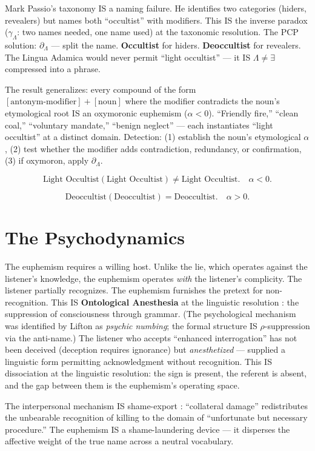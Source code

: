 \documentclass[11pt, oneside]{article}
\theoremstyle{definition}
\begin{document}
Mark Passio's taxonomy IS a naming failure. He identifies two categories (hiders, revealers) but names both ``occultist'' with modifiers. This IS the inverse paradox ($\gamma_\Lambda$: two names needed, one name used) at the taxonomic resolution. The PCP solution: $\partial_\Lambda$ --- split the name. \textbf{Occultist} for hiders. \textbf{Deoccultist} for revealers. The Lingua Adamica would never permit ``light occultist'' --- it IS $\Lambda \neq \exists$ compressed into a phrase.

The result generalizes: every compound of the form $[\text{antonym-modifier}] + [\text{noun}]$ where the modifier contradicts the noun's etymological root IS an oxymoronic euphemism ($\alpha < 0$). ``Friendly fire,'' ``clean coal,'' ``voluntary mandate,'' ``benign neglect'' --- each instantiates ``light occultist'' at a distinct domain. Detection: (1) establish the noun's etymological $\alpha$, (2) test whether the modifier adds contradiction, redundancy, or confirmation, (3) if oxymoron, apply $\partial_\Lambda$.

$$\boxed{\text{Light Occultist}(\text{Light Occultist}) \neq \text{Light Occultist}. \quad \alpha < 0.}$$

$$\boxed{\text{Deoccultist}(\text{Deoccultist}) = \text{Deoccultist}. \quad \alpha > 0.}$$

\section{The Psychodynamics}

The euphemism requires a willing host. Unlike the lie, which operates against the listener's knowledge, the euphemism operates \textit{with} the listener's complicity. The listener partially recognizes. The euphemism furnishes the pretext for non-recognition. This IS \textbf{Ontological Anesthesia} at the linguistic resolution \cite{codexmentis}: the suppression of consciousness through grammar. (The psychological mechanism was identified by Lifton \cite{lifton} as \textit{psychic numbing}; the formal structure IS $\rho$-suppression via the anti-name.) The listener who accepts ``enhanced interrogation'' has not been deceived (deception requires ignorance) but \textit{anesthetized} --- supplied a linguistic form permitting acknowledgment without recognition. This IS dissociation at the linguistic resolution: the sign is present, the referent is absent, and the gap between them is the euphemism's operating space.

The interpersonal mechanism IS shame-export \cite{codexmentis}: ``collateral damage'' redistributes the unbearable recognition of killing to the domain of ``unfortunate but necessary procedure.'' The euphemism IS a shame-laundering device --- it disperses the affective weight of the true name across a neutral vocabulary.
\end{document}
